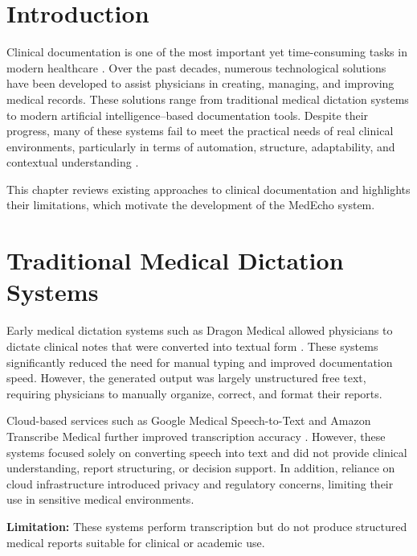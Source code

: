 
\section{Introduction}
\label{sec:lit:introduction}

Clinical documentation is one of the most important yet time-consuming tasks in modern healthcare \cite{gawande2018why}. Over the past decades, numerous technological solutions have been developed to assist physicians in creating, managing, and improving medical records. These solutions range from traditional medical dictation systems to modern artificial intelligence--based documentation tools. Despite their progress, many of these systems fail to meet the practical needs of real clinical environments, particularly in terms of automation, structure, adaptability, and contextual understanding \cite{thirunavukarasu2023large}.

This chapter reviews existing approaches to clinical documentation and highlights their limitations, which motivate the development of the MedEcho system.

\section{Traditional Medical Dictation Systems}
\label{sec:lit:dictation}

Early medical dictation systems such as Dragon Medical allowed physicians to dictate clinical notes that were converted into textual form \cite{nuance2023dragon}. These systems significantly reduced the need for manual typing and improved documentation speed. However, the generated output was largely unstructured free text, requiring physicians to manually organize, correct, and format their reports.

Cloud-based services such as Google Medical Speech-to-Text and Amazon Transcribe Medical further improved transcription accuracy \cite{aws2023transcribe}. However, these systems focused solely on converting speech into text and did not provide clinical understanding, report structuring, or decision support. In addition, reliance on cloud infrastructure introduced privacy and regulatory concerns, limiting their use in sensitive medical environments.

\textbf{Limitation:}  
These systems perform transcription but do not produce structured medical reports suitable for clinical or academic use.

